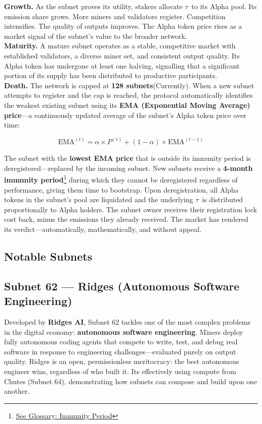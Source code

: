 \documentclass[12pt, a4paper, oneside]{report}
\newcommand{\TAO}{$\tau$}            %
\theoremstyle{definition}
\begin{document}
\textbf{Growth.} As the subnet proves its utility, stakers allocate \TAO\ 
to its Alpha pool. Its emission share grows. More miners and validators 
register. Competition intensifies. The quality of outputs improves. The 
Alpha token price rises as a market signal of the subnet's value to the 
broader network.\\[0.4cm]

\textbf{Maturity.} A mature subnet operates as a stable, competitive market 
with established validators, a diverse miner set, and consistent output 
quality. Its Alpha token has undergone at least one halving, signalling that 
a significant portion of its supply has been distributed to productive 
participants.\\[0.4cm]

\textbf{Death.} The network is capped at \textbf{128 subnets}(Currently). When a new 
subnet attempts to register and the cap is reached, the protocol automatically 
identifies the weakest existing subnet using its \textbf{EMA (Exponential Moving 
Average) price}—a continuously updated average of the subnet's Alpha token price 
over time:

\[
  \text{EMA}^{(t)} = \alpha \times P^{(t)} + (1 - \alpha) \times \text{EMA}^{(t-1)}
\]

The subnet with the \textbf{lowest EMA price} that is outside its immunity period 
is deregistered—replaced by the incoming subnet. New subnets receive a 
\textbf{4-month immunity period}\footnote{\hyperref[glossary]{See Glossary: Immunity Period}} during which they cannot be deregistered regardless 
of performance, giving them time to bootstrap. Upon deregistration, all Alpha tokens 
in the subnet's pool are liquidated and the underlying \TAO\ is distributed 
proportionally to Alpha holders. The subnet owner receives their registration lock 
cost back, minus the emissions they already received. The market has rendered its 
verdict—automatically, mathematically, and without appeal.

\subsection{Notable Subnets}

\subsection*{Subnet 62 — Ridges (Autonomous Software Engineering)}
Developed by \textbf{Ridges AI}, Subnet 62 tackles one of the most complex 
problems in the digital economy: \textbf{autonomous software engineering}. 
Miners deploy fully autonomous coding agents that compete to write, test, 
and debug real software in response to engineering challenges—evaluated 
purely on output quality. Ridges is an open, permissionless meritocracy: the best 
autonomous engineer wins, regardless of who built it. Its effectively using compute from Chutes (Subnet 64), demonstrating how subnets can 
compose and build upon one another.
\end{document}
